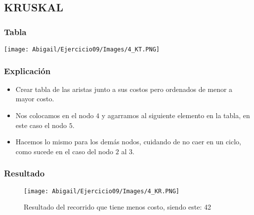 \documentclass[12pt]{article}
\begin{document}
    \subsection{KRUSKAL}
            \begin{multicols}{2}
                \subsubsection{Tabla}
                 \texttt{[image: Abigail/Ejercicio09/Images/4\_KT.PNG]}
                  
            \columnbreak
            
                \subsubsection{Explicación}
                    \begin{itemize}
            
                     \item[\checkmark] Crear tabla de las aristas junto a sus costos pero ordenados de menor a mayor costo.
    
                      \item[\checkmark] Nos colocamos en el nodo $4$ y agarramos al siguiente elemento en la tabla, en este caso el nodo $5$.
                      
                      \item[\checkmark] Hacemos lo mismo para los demás nodos, cuidando de no caer en un ciclo, como sucede en el caso del nodo $2$ al $3$.
            
                    \end{itemize}
            \end{multicols}

      \subsubsection{Resultado}

        \begin{figure}[h!]
          \centering
          \texttt{[image: Abigail/Ejercicio09/Images/4\_KR.PNG]}
          \caption{Resultado del recorrido que tiene menos costo, siendo este: 42}
        \end{figure} 

\newpage
  
\end{document}
